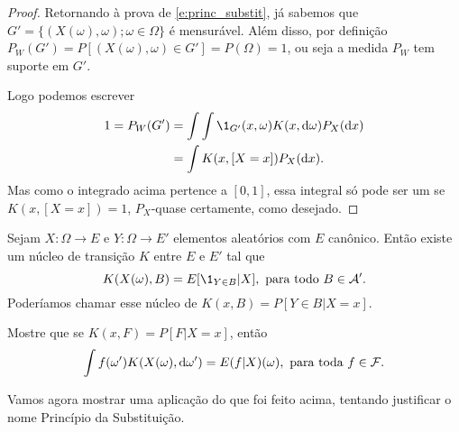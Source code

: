 \begin{proof}
  Retornando à prova de \eqref{e:princ_substit}, já sabemos que $G' = \{(X(\omega), \omega); \omega \in \Omega\}$ é mensurável.
  Além disso, por definição $P_W(G') = P[(X(\omega), \omega) \in G'] = P(\Omega) = 1$, ou seja a medida $P_W$ tem suporte em $G'$.

  Logo podemos escrever
  \begin{equation}
    \begin{split}
      1 = P_W(G') & = \int \int \1_{G'} (x, \omega) K(x, \d \omega)  P_X (\d x)\\
      & = \int K(x, [X = x]) P_X (\d x).
    \end{split}
  \end{equation}
  Mas como o integrado acima pertence a $[0,1]$, essa integral só pode ser um se $K(x, [X = x]) = 1$, $P_X$-quase certamente, como desejado.
\end{proof}

\begin{exercise}
  Sejam $X: \Omega \to E$ e $Y: \Omega \to E'$ elementos aleatórios com $E$ canônico.
  Então existe um núcleo de transição $K$ entre $E$ e $E'$ tal que
  \begin{equation}
    \label{e:regular_cond_prob_givenX}
    K(X(\omega), B) = E[\1_{Y \in B} | X], \text{ para todo $B \in \mathcal{A}'$}.
  \end{equation}
  Poderíamos chamar esse núcleo de $K(x, B) = P[Y \in B | X = x]$.
\end{exercise}

\begin{exercise}
  Mostre que se $K(x, F) = P[F| X = x]$, então
  \begin{equation}
    \label{e:reg_cond_exp_givenX}
    \int f(\omega') K(X(\omega), \mathop{}\!\mathrm{d} \omega') = E(f | X)(\omega), \text{ para toda $f \in \mathcal{F}$}.
  \end{equation}
\end{exercise}


Vamos agora mostrar uma aplicação do que foi feito acima, tentando justificar o nome Princípio da Substituição.

